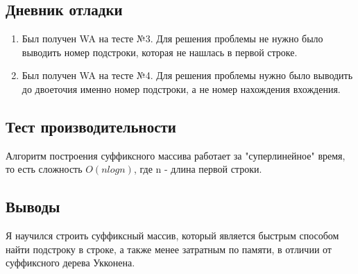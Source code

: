 \documentclass[12pt]{article}
\begin{document}
\newpage
\subsection*{Дневник отладки}

\begin{enumerate}
    \item Был получен WA на тесте №3. Для решения проблемы не нужно было выводить номер подстроки, которая не нашлась в первой строке.
    \item Был получен WA на тесте №4. Для решения проблемы нужно было выводить до двоеточия именно номер подстроки, а не номер нахождения вхождения.
\end{enumerate}

\newpage
\subsection*{Тест производительности}

Алгоритм построения суффиксного массива работает за "суперлинейное" время, то есть сложность $O(n log n)$, где n - длина первой строки.



\newpage
\subsection*{Выводы}


Я научился строить суффиксный массив, который является быстрым способом найти подстроку в строке, а также менее затратным по памяти, в отличии от суффиксного дерева Укконена. 
\end{document}
